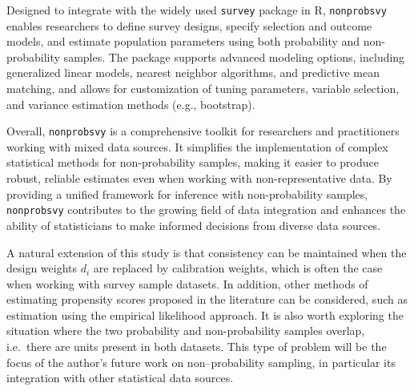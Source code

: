 \documentclass[
]{jss}
\begin{document}
Designed to integrate with the widely used \texttt{survey} package in R,
\texttt{nonprobsvy} enables researchers to define survey designs,
specify selection and outcome models, and estimate population parameters
using both probability and non-probability samples. The package supports
advanced modeling options, including generalized linear models, nearest
neighbor algorithms, and predictive mean matching, and allows for
customization of tuning parameters, variable selection, and variance
estimation methods (e.g., bootstrap).

Overall, \texttt{nonprobsvy} is a comprehensive toolkit for researchers
and practitioners working with mixed data sources. It simplifies the
implementation of complex statistical methods for non-probability
samples, making it easier to produce robust, reliable estimates even
when working with non-representative data. By providing a unified
framework for inference with non-probability samples,
\texttt{nonprobsvy} contributes to the growing field of data integration
and enhances the ability of statisticians to make informed decisions
from diverse data sources.

A natural extension of this study is that consistency can be maintained
when the design weights \(d_i\) are replaced by calibration weights,
which is often the case when working with survey sample datasets. In
addition, other methods of estimating propensity scores proposed in the
literature can be considered, such as estimation using the empirical
likelihood approach. It is also worth exploring the situation where the
two probability and non-probability samples overlap, i.e.~there are
units present in both datasets. This type of problem will be the focus
of the author's future work on non--probability sampling, in particular
its integration with other statistical data sources.


\end{document}
